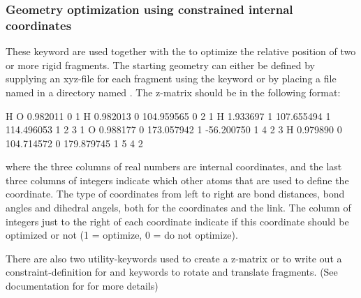 \subsubsection{Geometry optimization using constrained internal coordinates}
These keyword are used together with the  to optimize the relative position of two or
more rigid fragments. The starting geometry can either be defined by supplying an xyz-file for each
fragment using the keyword  or by placing a file named  in a directory
named . The z-matrix should be in the following format:

\begin{sourcelisting}
H
O     0.982011 0                                 1
H     0.982013 0   104.959565 0                  2   1
H     1.933697 1   107.655494 1   114.496053 1   2   3   1
O     0.988177 0   173.057942 1   -56.200750 1   4   2   3
H     0.979890 0   104.714572 0   179.879745 1   5   4   2
\end{sourcelisting}

where the three columns of real numbers are internal coordinates, and the last
three columns of integers indicate which other atoms that are used to define
the coordinate. The type of coordinates from left to right are bond distances,
bond angles and dihedral angels, both for the coordinates and the link. The
column of integers just to the right of each coordinate indicate if this
coordinate should be optimized or not (1 = optimize, 0 = do not optimize).

There are also two utility-keywords used to create a z-matrix or to write out
a constraint-definition for  and keywords to rotate and translate
fragments. (See documentation for  for more details)

